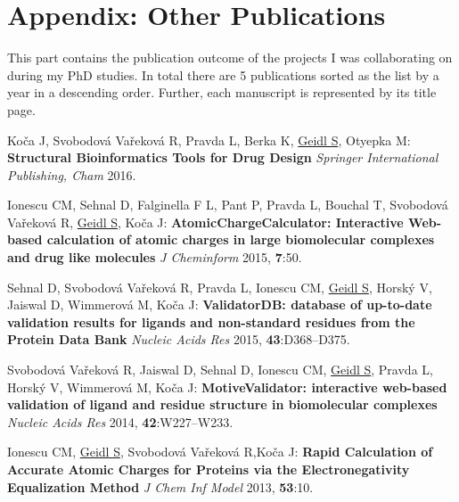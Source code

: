 \chapter{Appendix: Other Publications}
\label{chapter:publications}

This part contains the publication outcome of the projects I was collaborating
on during my PhD studies. In total there are 5 publications sorted as the list
by a year in a descending order. Further, each manuscript is represented by
its title page.

\vspace{5mm}

Koča J, Svobodová Vařeková R, Pravda L, Berka K, \underline{Geidl S}, Otyepka M:
\textbf{Structural Bioinformatics Tools for Drug Design}
\textit{Springer International Publishing, Cham} 2016.

\vspace{5mm}

Ionescu CM, Sehnal D, Falginella F L, Pant P, Pravda L, Bouchal T,
Svobodová Vařeková R, \underline{Geidl S}, Koča J: 
\textbf{AtomicChargeCalculator: Interactive Web-based calculation of atomic
charges in large biomolecular complexes and drug like molecules}
\textit{J Cheminform} 2015, \textbf{7}:50.

\vspace{5mm}

Sehnal D, Svobodová Vařeková R, Pravda L, Ionescu CM, \underline{Geidl S},
Horský V, Jaiswal D, Wimmerová M, Koča J: \textbf{ValidatorDB: database of up-to-date
validation results for ligands and non-standard residues from the Protein Data Bank}
\textit{Nucleic Acids Res} 2015, \textbf{43}:D368--D375.

\vspace{5mm}

Svobodová Vařeková R, Jaiswal D, Sehnal D, Ionescu CM, \underline{Geidl S},
Pravda L, Horský V, Wimmerová M, Koča J: \textbf{MotiveValidator: interactive
web-based validation of ligand and residue structure in biomolecular complexes}
\textit{Nucleic Acids Res} 2014, \textbf{42}:W227--W233.


\vspace{5mm}

Ionescu CM, \underline{Geidl S}, Svobodová Vařeková R,Koča J: \textbf{Rapid Calculation
of Accurate Atomic Charges for Proteins via the Electronegativity Equalization Method}
\textit{J Chem Inf Model} 2013, \textbf{53}:10.


\clearpage

